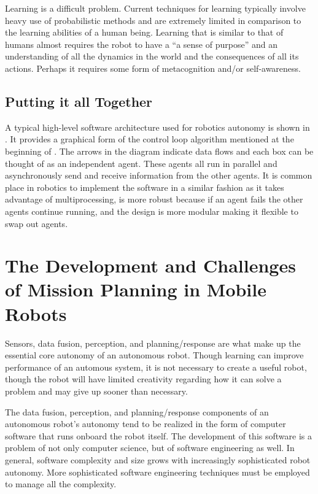 Learning is a difficult problem. Current techniques for learning typically involve heavy use of probabilistic methods and are extremely limited in comparison to the learning abilities of a human being. Learning that is similar to that of humans almost requires the robot to have a ``a sense of purpose'' and an understanding of all the dynamics in the world and the consequences of all its actions. Perhaps it requires some form of metacognition and/or self-awareness.

\subsection{Putting it all Together}
A typical high-level software architecture used for robotics autonomy is shown in . It provides a graphical form of the control loop algorithm mentioned at the beginning of . The arrows in the diagram indicate data flows and each box can be thought of as an independent agent. These agents all run in parallel and asynchronously send and receive information from the other agents. It is common place in robotics to implement the software in a similar fashion as it takes advantage of multiprocessing, is more robust because if an agent fails the other agents continue running, and the design is more modular making it flexible to swap out agents.

\section{The Development and Challenges of Mission Planning in Mobile Robots}
Sensors, data fusion, perception, and planning/response are what make up the essential core autonomy of an autonomous robot. Though learning can improve performance of an automous system, it is not necessary to create a useful robot, though the robot will have limited creativity regarding how it can solve a problem and may give up sooner than necessary.

The data fusion, perception, and planning/response components of an autonomous robot's autonomy tend to be realized in the form of computer software that runs onboard the robot itself. The development of this software is a problem of not only computer science, but of software engineering as well. In general, software complexity and size grows with increasingly sophisticated robot autonomy. More sophisticated software engineering techniques must be employed to manage all the complexity.

